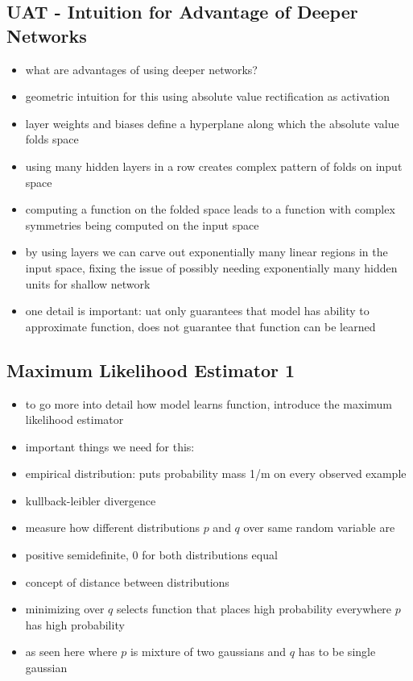 \documentclass{article}
\begin{document}
\subsection*{UAT - Intuition for Advantage of Deeper Networks}
\begin{itemize}
    \item what are advantages of using deeper networks?
    \item geometric intuition for this using absolute value rectification as activation
    \item layer weights and biases define a hyperplane along which the absolute value folds space
    \item using many hidden layers in a row creates complex pattern of folds on input space
    \item computing a function on the folded space leads to a function with complex symmetries being computed on the input space
    \item by using layers we can carve out exponentially many linear regions in the input space, fixing the issue of possibly needing exponentially many hidden units for shallow network
    
    \item one detail is important: uat only guarantees that model has ability to approximate function, does not guarantee that function can be learned
\end{itemize}

\subsection*{Maximum Likelihood Estimator 1}
\begin{itemize}
    \item to go more into detail how model learns function, introduce the maximum likelihood estimator
    \item important things we need for this:
    \item empirical distribution: puts probability mass 1/m on every observed example
    \item kullback-leibler divergence
    \item measure how different distributions $p$ and $q$ over same random variable are
    \item positive semidefinite, 0 for both distributions equal
    \item concept of distance between distributions
    \item minimizing over $q$ selects function that places high probability everywhere $p$ has high probability
    \item as seen here where $p$ is mixture of two gaussians and $q$ has to be single gaussian
\end{itemize}
\end{document}
